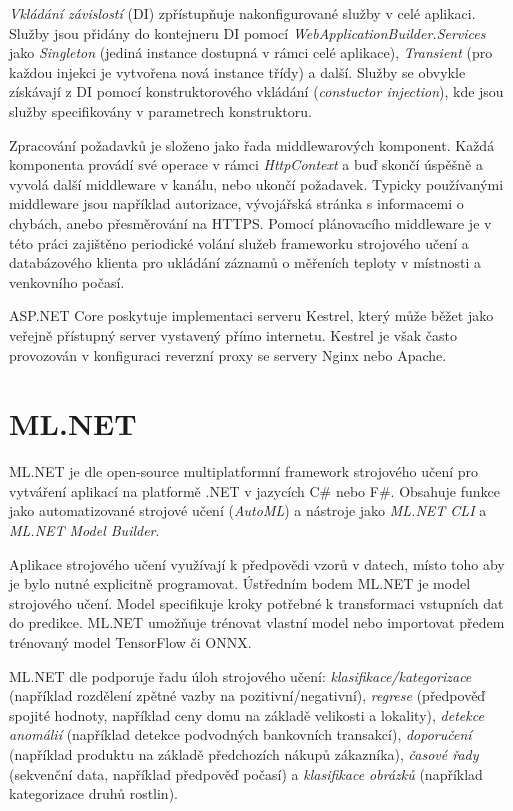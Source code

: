 {\it Vkládání závislostí} (DI) zpřístupňuje nakonfigurované služby v celé aplikaci. Služby jsou přidány do kontejneru DI pomocí {\it WebApplicationBuilder.Services} jako {\it Singleton} (jediná instance dostupná v rámci celé aplikace), {\it Transient} (pro každou injekci je vytvořena nová instance třídy) a další. Služby se obvykle získávají z DI pomocí konstruktorového vkládání ({\it constuctor injection}), kde jsou služby specifikovány v parametrech konstruktoru.

Zpracování požadavků je složeno jako řada middlewarových komponent. Každá komponenta provádí své operace v rámci {\it HttpContext} a buď skončí úspěšně a vyvolá další middleware v kanálu, nebo ukončí požadavek. Typicky používanými middleware jsou například autorizace, vývojářská stránka s informacemi o chybách, anebo přesměrování na HTTPS. Pomocí plánovacího middleware je v této práci zajištěno periodické volání služeb frameworku strojového učení a databázového klienta pro ukládání záznamů o měřeních teploty v místnosti a venkovního počasí.

ASP.NET Core poskytuje implementaci serveru Kestrel, který může běžet jako veřejně přístupný server vystavený přímo internetu. Kestrel je však často provozován v konfiguraci reverzní proxy se servery Nginx nebo Apache.


\section{ML.NET}
ML.NET je dle \cite{what_is_mlnet1} open-source multiplatformní framework strojového učení pro vytváření aplikací na platformě .NET v jazycích C\# nebo F\#. Obsahuje funkce jako automatizované strojové učení ({\it AutoML}) a nástroje jako {\it ML.NET CLI} a {\it ML.NET Model Builder}.

Aplikace strojového učení využívají k předpovědi vzorů v datech, místo toho aby je bylo nutné explicitně programovat. Ústředním bodem ML.NET je model strojového učení. Model specifikuje kroky potřebné k transformaci vstupních dat do predikce. ML.NET umožňuje trénovat vlastní model nebo importovat předem trénovaný model TensorFlow či ONNX.

ML.NET dle \cite{what_is_mlnet2} podporuje řadu úloh strojového učení: {\it klasifikace/kategorizace} (například rozdělení zpětné vazby na pozitivní/negativní), {\it regrese} (předpověď spojité hodnoty, například ceny domu na základě velikosti a lokality), {\it detekce anomálií} (například detekce podvodných bankovních transakcí), {\it doporučení} (například produktu na základě předchozích nákupů zákazníka), {\it časové řady} (sekvenční data, například předpověď počasí) a {\it klasifikace obrázků} (například kategorizace druhů rostlin).


